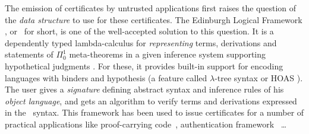 \documentclass{llncs}
\begin{document}
The emission of certificates by untrusted applications first raises
the question of the \emph{data structure} to use for these
certificates. %
The Edinburgh Logical Framework \cite{harper1993framework}, or \LF\
for short, is one of the well-accepted solution to this question. It
is a dependently typed lambda-calculus for \emph{representing} terms,
derivations and statements of $\Pi_0^1$ meta-theorems in a given
inference system supporting hypothetical judgments
\cite{pfenning2001logical}. For these, it provides built-in support
for encoding languages with binders and hypothesis (a feature called
$\lambda$-tree syntax or HOAS \cite{pfenning1988higher}). The user
gives a \emph{signature} defining abstract syntax and inference rules
of his \emph{object language}, and gets an algorithm to verify terms
and derivations expressed in the \LF\ syntax.
This framework has been used to issue certificates for a number of
practical applications like proof-carrying
code~\cite{necula1997proof}, authentication
framework~\cite{appel1999proof} \ldots %
\end{document}
